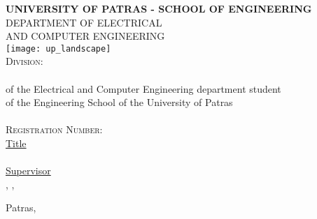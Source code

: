 \begin{titlepage}
\begin{center}
\textsc{\textbf{\large UNIVERSITY OF PATRAS - SCHOOL OF ENGINEERING}\\%
\large DEPARTMENT OF ELECTRICAL\\AND COMPUTER ENGINEERING}\\

\texttt{[image: up\_landscape]}\\  

\textsc{\Large Division: \divisionEnglish}\\[1cm]

\textsc{\uline{\LARGE{\shortdoctitleEnglish}}}\\ [0.5cm]
of the Electrical and Computer Engineering department student\\
of the Engineering School of the University of Patras\\[1cm]

\textsc{\LARGE \nommeEnglish}\\[0.5cm]
\textsc{\Large Registration Number: \studnum}\\[1cm]

\uline{\large Title}\\[0.5cm]
\textbf{\large \doctitleEnglish}\\[1cm]
\uline{\large Supervisor}\\[0.5cm]
\large \supnameEN, \suptitleEN, \uoPEnglish\\[1cm]
\begin{center}
\end{center}
\vfill
\large{Patras, \telosmonthyearEN}
\end{center}
\end{titlepage}